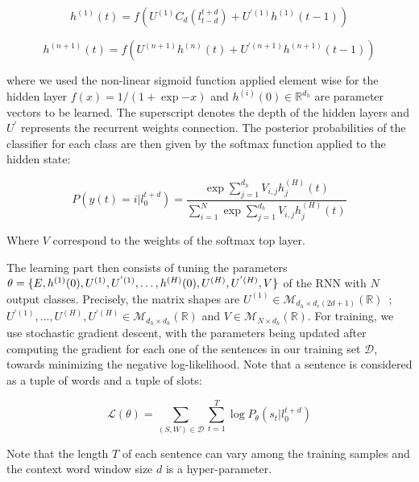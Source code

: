 \begin{equation}
h^{(1)}(t) = f(U^{(1)}C_{d}(l_{t-d}^{t+d})+U^{'(1)}h^{(1)}(t-1))
\end{equation}

\begin{equation}
h^{(n+1)}(t) = f(U^{(n+1)}h^{(n)}(t) + U^{'(n+1)}h^{(n+1)}(t-1))
\end{equation}


where we used the non-linear sigmoid function applied element wise for the
hidden layer $f(x)=1/(1+\exp{-x})$ and $h^{(i)} (0)\in\mathbb{R}^{d_h}$ are parameter vectors
to be learned. The superscript denotes the depth of the hidden layers and $U^{'}$
represents the recurrent weights connection. The posterior probabilities of the
classifier for each class are then given by the softmax function applied to the
hidden state:

\begin{equation}
P(y(t) = i \vert l_{0}^{t+d}) = \frac{\exp{\sum_{j=1}^{d_{h}}}V_{i,j}h_{j}^{(H)}(t)}{\sum_{i=1}^{N}\exp{\sum_{j=1}^{d_{h}}}V_{i,j}h_{j}^{(H)}(t)}
\end{equation}

Where $V$ correspond to the weights of the softmax top layer. 

The learning part then consists of tuning the parameters $\theta=\{ E, h^{(1)}
(0), U^{(1)}, \\ U^{'(1)},\dots,h^{(H)} (0), U^{(H)}, U^{'(H)} ,V \}$   of the RNN with $N$
output classes. Precisely, the matrix shapes are $U^{(1)}\in\mathcal{M}_{d_h\times d_e (2d+1)}
(\mathbb{R})$~;~ $U^{'(1)},\dots,U^{(H)}, U^{'(H)}\in\mathcal{M}_{d_h\times d_h} (\mathbb{R})$ and $V\in\mathcal{M}_{N\times d_h}(\mathbb{R})$. For
training, we use stochastic gradient descent, with the parameters being updated
after computing the gradient for each one of the sentences in our training set
$\mathcal{D}$, towards minimizing the negative log-likelihood. Note that a sentence is
considered as a tuple of words and a tuple of slots:

\begin{equation}
\mathcal{L}(\theta) = \sum_{(S,W)\in\mathcal{D}} \sum_{t=1}^{T}\log P_{\theta}(s_{t}\vert l_{0}^{t+d})
\end{equation}

Note that the length $T$ of each sentence can vary among the training samples and
the context word window size $d$ is a hyper-parameter.  


